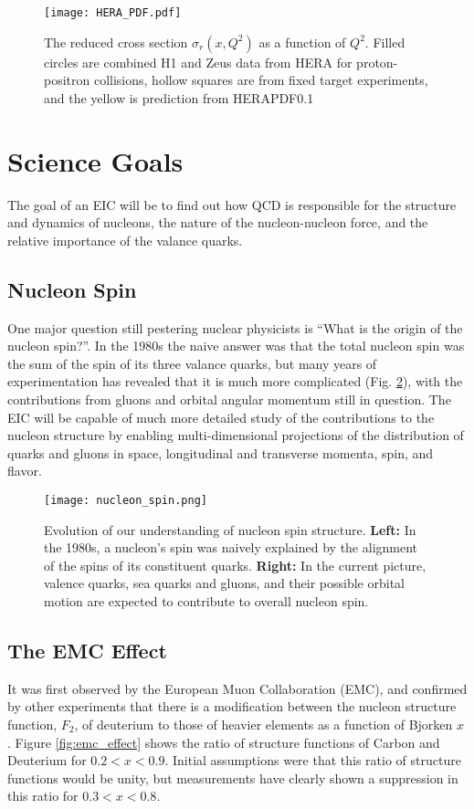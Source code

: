 \begin{figure}[ht]
	\centering
	\texttt{[image: HERA\_PDF.pdf]}
	\caption{The reduced cross section $\sigma_{r}(x,Q^2)$ as a function of $Q^2$. Filled circles are combined H1 and Zeus data from HERA for proton-positron collisions, hollow squares are from fixed target experiments, and the yellow is prediction from HERAPDF0.1}
	\label{fig:HERA_pdf}
\end{figure}

\section{Science Goals}
The goal of an EIC will be to find out how QCD is responsible for the structure and dynamics of nucleons, the nature of the nucleon-nucleon force, and the relative importance of the valance quarks.

\subsection{Nucleon Spin}
One major question still pestering nuclear physicists is ``What is the origin of the nucleon spin?''. In the 1980s the naive answer was that the total nucleon spin was the sum of the spin of its three valance quarks, but many years of experimentation has revealed that it is much more complicated (Fig. \ref{fig:nucleon_spin}), with the contributions from gluons and orbital angular momentum still in question. The EIC will be capable of much more detailed study of the contributions to the nucleon structure by enabling multi-dimensional projections of the distribution of quarks and gluons in space, longitudinal and transverse momenta, spin, and flavor.

\begin{figure}[ht]
	\centering
	\texttt{[image: nucleon\_spin.png]}
	\caption{Evolution of our understanding of nucleon spin structure. \textbf{Left:} In the 1980s, a nucleon’s spin was naively explained by the alignment of the spins of its constituent quarks. \textbf{Right:} In the current picture, valence quarks, sea quarks and gluons, and their possible orbital motion are expected to contribute to overall nucleon spin.}
	\label{fig:nucleon_spin}
\end{figure}

\subsection{The EMC Effect}
It was first observed by the European Muon Collaboration (EMC), and confirmed by other experiments that there is a modification between the nucleon structure function, $F_2$, of deuterium to those of heavier elements as a function of Bjorken $x$ \cite{SRC_EMC_effect}. Figure \ref{fig:emc_effect} shows the ratio of structure functions of Carbon and Deuterium for $0.2 < x < 0.9$. Initial assumptions were that this ratio of structure functions would be unity, but measurements have clearly shown a suppression in this ratio for $0.3 < x < 0.8$.


